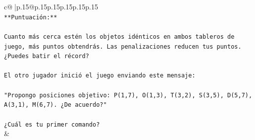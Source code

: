\documentclass{article}
\begin{document}
{\begin{supertabular}{c@{$\;$}|p{.15\linewidth}@{}p{.15\linewidth}p{.15\linewidth}p{.15\linewidth}p{.15\linewidth}p{.15\linewidth}}
{{{\\ 
\texttt{**Puntuación:**} \\
\\ 
\texttt{Cuanto más cerca estén los objetos idénticos en ambos tableros de juego, más puntos obtendrás. Las penalizaciones reducen tus puntos. ¿Puedes batir el récord?} \\
\\ 
\texttt{El otro jugador inició el juego enviando este mensaje:} \\
\\ 
\texttt{"Propongo posiciones objetivo: P(1,7), O(1,3), T(3,2), S(3,5), D(5,7), A(3,1), M(6,7). ¿De acuerdo?"} \\
\\ 
\texttt{¿Cuál es tu primer comando?} \\
            }
        }
    }
    & \\ \\


\end{supertabular}}
\end{document}
